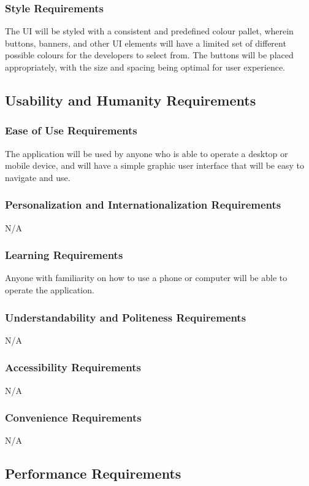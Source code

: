 \documentclass[12pt]{article}
\begin{document}
\subsubsection{Style Requirements}
The UI will be styled with a consistent and predefined colour pallet, wherein buttons, banners, and other UI elements will have a limited set of different possible colours for the developers to select from. 
The buttons will be placed appropriately, with the size and spacing being optimal for user experience.

\subsection{Usability and Humanity Requirements}

\subsubsection{Ease of Use Requirements}
The application will be used by anyone who is able to operate a desktop or mobile device, and will have a simple graphic user interface that will be easy to navigate and use.

\subsubsection{Personalization and Internationalization Requirements}
N/A

\subsubsection{Learning Requirements}
Anyone with familiarity on how to use a phone or computer will be able to operate the application.

\subsubsection{Understandability and Politeness Requirements}
N/A

\subsubsection{Accessibility Requirements}
N/A

\subsubsection{Convenience Requirements}
N/A
\subsection{Performance Requirements}
\end{document}
